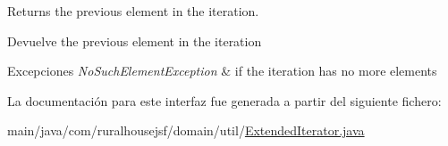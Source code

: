 Returns the previous element in the iteration.

\begin{DoxyReturn}{Devuelve}
the previous element in the iteration 
\end{DoxyReturn}

\begin{DoxyExceptions}{Excepciones}
{\em No\+Such\+Element\+Exception} & if the iteration has no more elements \\
\hline
\end{DoxyExceptions}


La documentación para este interfaz fue generada a partir del siguiente fichero\+:\begin{DoxyCompactItemize}
\item 
main/java/com/ruralhousejsf/domain/util/\mbox{\hyperlink{_extended_iterator_8java}{Extended\+Iterator.\+java}}\end{DoxyCompactItemize}
